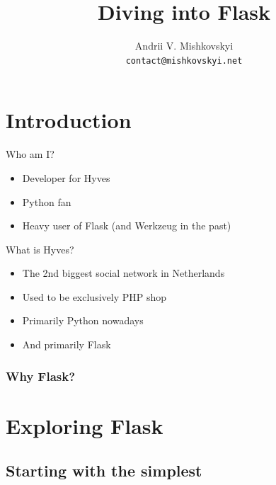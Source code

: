\documentclass{beamer}
\title{Diving into Flask}
\author[A. Mishkovskyi]{Andrii V. Mishkovskyi \\ \texttt{contact@mishkovskyi.net}}
\date[EuroPython 2012]
\begin{document}
\lstset{
  language=Python,
  basicstyle=\ttfamily,
  columns=fixed,
  showspaces=false,
  showstringspaces=false,
}

\section{Introduction}


\begin{frame}{Who am I?}
  \begin{itemize}
  \item Developer for Hyves
  \item Python fan
  \item Heavy user of Flask (and Werkzeug in the past)
  \end{itemize}
\end{frame}

\begin{frame}{What is Hyves?}
  \begin{itemize}
  \item The 2nd biggest social network in Netherlands
  \item Used to be exclusively PHP shop
  \item Primarily Python nowadays
  \item And primarily Flask
  \end{itemize}
\end{frame}

\begin{frame}
  \frametitle{Why Flask?}
\end{frame}

\section{Exploring Flask}

\subsection{Starting with the simplest}
\end{document}
